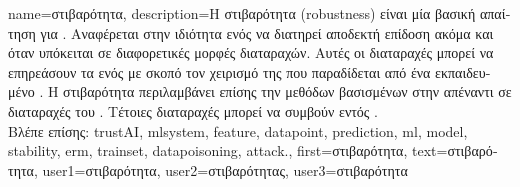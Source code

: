 {name={\foreignlanguage{greek}{στιβαρότητα}},
	description={\foreignlanguage{greek}{Η στιβαρότητα} (robustness) 
		\foreignlanguage{greek}{είναι μία βασική απαίτηση για}
		. \foreignlanguage{greek}{Αναφέρεται στην ιδιότητα ενός}  
		\foreignlanguage{greek}{να διατηρεί αποδεκτή επίδοση ακόμα και όταν υπόκειται σε διαφορετικές μορφές 
		διαταραχών. Αυτές οι διαταραχές μπορεί να επηρεάσουν τα}  \foreignlanguage{greek}{ενός} 
		 \foreignlanguage{greek}{με σκοπό τον χειρισμό της}  
		\foreignlanguage{greek}{που παραδίδεται από ένα εκπαιδευμένο}  . 
		\foreignlanguage{greek}{Η στιβαρότητα περιλαμβάνει επίσης την}  \foreignlanguage{greek}{μεθόδων 
		βασισμένων στην}  \foreignlanguage{greek}{απέναντι σε διαταραχές του} . 
		\foreignlanguage{greek}{Τέτοιες διαταραχές μπορεί να συμβούν εντός}  . 
		\\
		\foreignlanguage{greek}{Βλέπε επίσης:} \gls{trustAI}, \gls{mlsystem}, \gls{feature}, \gls{datapoint}, \gls{prediction}, 
		\gls{ml}, \gls{model}, \gls{stability}, \gls{erm}, \gls{trainset}, \gls{datapoisoning}, \gls{attack}.}, 
	first={\foreignlanguage{greek}{στιβαρότητα}}, 
	text={\foreignlanguage{greek}{στιβαρότητα}},
	user1={\foreignlanguage{greek}{στιβαρότητα}}, %
  	user2={\foreignlanguage{greek}{στιβαρότητας}}, %
	user3={\foreignlanguage{greek}{στιβαρότητα}} %
}%

